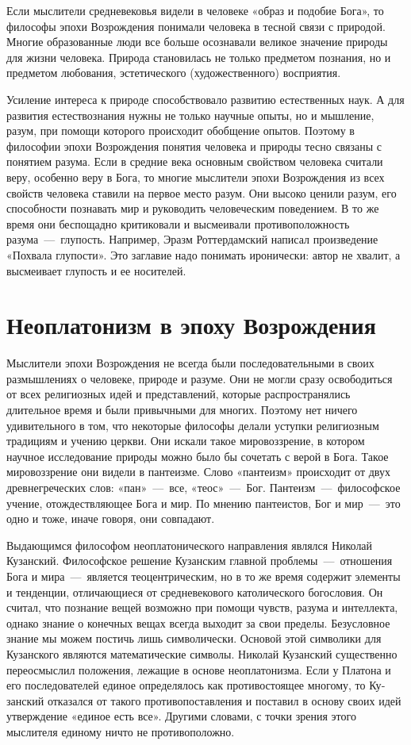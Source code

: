 \documentclass[14pt]{extarticle}
\begin{document}
Если мыслители средневековья видели в человеке «образ и подобие Бога», то философы эпохи Возрождения понимали человека в тесной связи с природой. Многие образованные люди все больше осознавали великое значение природы для жизни человека. Природа становилась не только предметом познания, но и предметом любования, эстетического (художественного) восприятия.

Усиление интереса к природе способствовало развитию естественных наук. А для развития естествознания нужны не только научные опыты, но и мышление, разум, при помощи которого происходит обобщение опытов. Поэтому в философии эпохи Возрождения понятия человека и природы тесно связаны с понятием разума. Если в средние века основным свойством человека считали веру, особенно веру в Бога, то многие мыслители эпохи Возрождения из всех свойств человека ставили на первое место разум. Они высоко ценили разум, его способности познавать мир и руководить человеческим поведением. В то же время они беспощадно критиковали и высмеивали противоположность разума~---~глупость. Например, Эразм Роттердамский написал произведение «Похвала глупости». Это заглавие надо понимать иронически: автор не хвалит, а высмеивает глупость и ее носителей.

\section{Неоплатонизм в эпоху Возрождения}

Мыслители эпохи Возрождения не всегда были последовательными в своих размышлениях о человеке, природе и разуме. Они не могли сразу освободиться от всех религиозных идей и представлений, которые распространялись длительное время и были привычными для многих. Поэтому нет ничего удивительного в том, что некоторые философы делали уступки религиозным традициям и учению церкви. Они искали такое мировоззрение, в котором научное исследование природы можно было бы сочетать с верой в Бога. Такое мировоззрение они видели в пантеизме. Слово «пантеизм» происходит от двух древнегреческих слов: «пан»~---~все, «теос»~---~Бог. Пантеизм~---~философское учение, отождествляющее Бога и мир. По мнению пантеистов, Бог и мир~---~это одно и тоже, иначе говоря, они совпадают.

Выдающимся философом неоплатонического направления являлся Николай Кузанский. Философское решение Кузанским главной пробле­мы~---~отношения Бога и мира~---~является теоцентрическим, но в то же время содержит элементы и тенден­ции, отличающиеся от средневекового католического богословия. Он считал, что познание вещей возможно при помощи чувств, разума и интеллекта, однако зна­ние о конечных вещах всегда выходит за свои пределы. Безусловное знание мы можем постичь лишь символически. Основой этой символики для Кузанского являются математические символы. Николай Кузанский существенно переосмыслил положения, лежа­щие в основе неоплатонизма. Если у Платона и его последователей единое определялось как противостоящее многому, то  Ку­занский отказался от такого противопоставления и поставил в основу своих идей утверждение «единое есть все». Другими словами, с точки зрения этого мыслителя единому ничто не противоположно.
\end{document}
